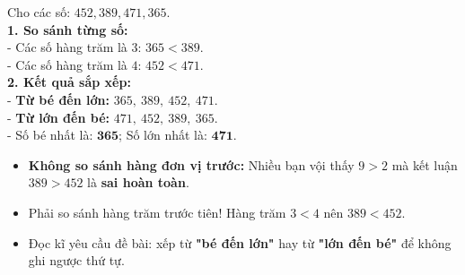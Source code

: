 \documentclass[10pt,a4paper]{article}
\begin{document}
\vspace{-1.5mm}
\noindent
\begin{minipage}[t]{0.49\textwidth}\vspace{0pt}
\begin{tcolorbox}[
  enhanced,
  colback=green!4!white,
  colframe=green!60!black,
  arc=2mm, boxrule=0.8pt,
  left=2mm, right=2mm, top=1.8mm, bottom=1.8mm,
  title={\footnotesize\bfseries\color{white}\faCheckCircle\ 4. Ví dụ mẫu sắp xếp thứ tự}
]
{\footnotesize
Cho các số: $452, 389, 471, 365$.\\
\textbf{1. So sánh từng số:}\\
- Các số hàng trăm là $3$: $365 < 389$.\\
- Các số hàng trăm là $4$: $452 < 471$.\\
\textbf{2. Kết quả sắp xếp:}\\
- \textbf{Từ bé đến lớn:} $365,\ 389,\ 452,\ 471$.\\
- \textbf{Từ lớn đến bé:} $471,\ 452,\ 389,\ 365$.\\
- Số bé nhất là: $\mathbf{365}$; Số lớn nhất là: $\mathbf{471}$.
}
\end{tcolorbox}
\end{minipage}
\hfill
\begin{minipage}[t]{0.49\textwidth}\vspace{0pt}
\begin{tcolorbox}[
  enhanced,
  colback=rose!4!white,
  colframe=rose!70!black,
  arc=2mm, boxrule=0.8pt,
  left=2mm, right=2mm, top=1.8mm, bottom=1.8mm,
  title={\footnotesize\bfseries\color{white}\faExclamationTriangle\ 5. Cạm bẫy cần tránh}
]
{\footnotesize
\begin{itemize}\setlength{\itemsep}{1.5pt}\setlength{\leftskip}{-2.5mm}
  \item \textbf{Không so sánh hàng đơn vị trước:} Nhiều bạn vội thấy $9 > 2$ mà kết luận $389 > 452$ là \textbf{sai hoàn toàn}.
  \item Phải so sánh hàng trăm trước tiên! Hàng trăm $3 < 4$ nên $389 < 452$.
  \item Đọc kĩ yêu cầu đề bài: xếp từ \textbf{"bé đến lớn"} hay từ \textbf{"lớn đến bé"} để không ghi ngược thứ tự.
\end{itemize}
}
\end{tcolorbox}
\end{minipage}
\end{document}
